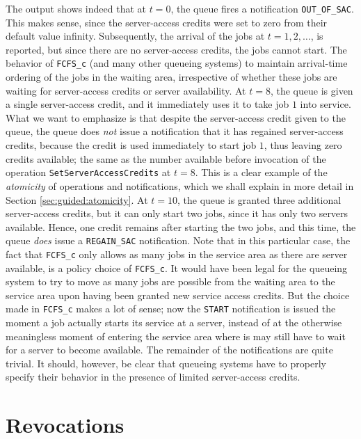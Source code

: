 \documentclass[12pt]{book}
\begin{document}
The output shows indeed that at $t=0$,
  the queue fires a notification \lstinline|OUT_OF_SAC|.
This makes sense, since the server-access credits
  were set to zero from their default
  value infinity.
Subsequently,
  the arrival of the jobs at $t=1, 2, \ldots$,
  is reported,
  but since there are no server-access credits,
  the jobs cannot start.
The behavior of \lstinline|FCFS_c|
  (and many other queueing systems)
  to maintain arrival-time ordering
  of the jobs in the waiting area,
  irrespective of
  whether these jobs are waiting for
  server-access credits or server availability.
At $t=8$, the queue is given a single
  server-access credit,
  and it immediately uses it to
  take job $1$ into service.
What we want to emphasize is that
  despite the server-access credit given to the queue,
  the queue does {\em not\/} issue a notification
  that it has regained server-access credits,
  because the credit is used immediately to start
  job $1$, thus leaving zero credits available;
  the same as the number available before
  invocation of the operation \lstinline|SetServerAccessCredits|
  at $t=8$.
This is a clear example of the {\em atomicity\/}
  of operations and notifications,
  which we shall explain in more detail in Section \ref{sec:guided:atomicity}.
At $t=10$, the queue is granted three additional server-access credits,
  but it can only start two jobs, since it has only two servers available.
Hence, one credit remains after starting the two jobs,
  and this time,
  the queue {\em does\/} issue
  a \lstinline|REGAIN_SAC| notification.
Note that in this particular case,
  the fact that \lstinline|FCFS_c|
  only allows as many jobs in the service area as there are server available,
  is a policy choice of \lstinline|FCFS_c|.
It would have been legal for the queueing system
  to try to move as many jobs are possible from the waiting area
  to the service area upon having been granted new service access credits.
But the choice made in \lstinline|FCFS_c| makes a lot of sense;
  now the \lstinline|START| notification
  is issued the moment a job actually starts its service at a
  server,
  instead of at the otherwise meaningless moment
  of entering the service area
  where is may still have to wait for a server to become available.
The remainder of the notifications are quite trivial.
It should, however,
  be clear that queueing systems have to properly
  specify their behavior in the presence of limited
  server-access credits.

\section{Revocations}
\label{sec:guided:revocations}
\end{document}
